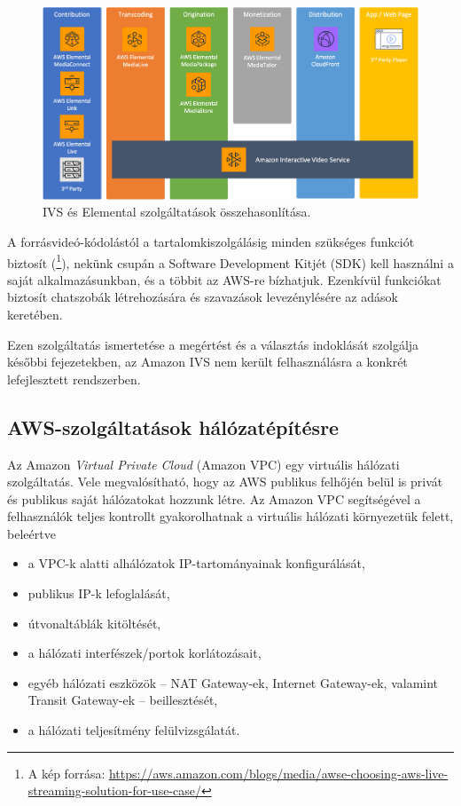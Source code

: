 \begin{figure}[h]
	\centering
	\includegraphics[width=150mm, keepaspectratio]{figures/aws_media.png}
	\caption{IVS és Elemental szolgáltatások összehasonlítása.}
	\label{fig:ivselemental}
\end{figure}

A forrásvideó-kódolástól a tartalomkiszolgálásig minden szükséges funkciót biztosít (\footnote{A kép forrása: \url{https://aws.amazon.com/blogs/media/awse-choosing-aws-live-streaming-solution-for-use-case/}}), nekünk csupán a Software Development Kitjét (SDK) kell használni a saját alkalmazásunkban, és a többit az AWS-re bízhatjuk. Ezenkívül funkciókat biztosít chatszobák létrehozására és szavazások levezénylésére az adások keretében.

Ezen szolgáltatás ismertetése a megértést és a választás indoklását szolgálja későbbi fejezetekben, az Amazon IVS nem került felhasználásra a konkrét lefejlesztett rendszerben.

\subsection{AWS-szolgáltatások hálózatépítésre}

Az Amazon \emph{Virtual Private Cloud} (Amazon VPC) egy virtuális hálózati szolgáltatás. Vele megvalósítható, hogy az AWS publikus felhőjén belül is privát és publikus saját hálózatokat hozzunk létre. Az Amazon VPC segítségével a felhasználók teljes kontrollt gyakorolhatnak a virtuális hálózati környezetük felett, beleértve 

\begin{itemize}
	\setlength{\itemsep}{1pt}
  \setlength{\parskip}{0pt}
  \setlength{\parsep}{0pt}
	\item a VPC-k alatti alhálózatok IP-tartományainak konfigurálását,
	\item publikus IP-k lefoglalását,
	\item útvonaltáblák kitöltését,
	\item a hálózati interfészek/portok korlátozásait,
	\item egyéb hálózati eszközök -- NAT Gateway-ek, Internet Gateway-ek, valamint Transit Gateway-ek -- beillesztését,
	\item a hálózati teljesítmény felülvizsgálatát.
\end{itemize}


